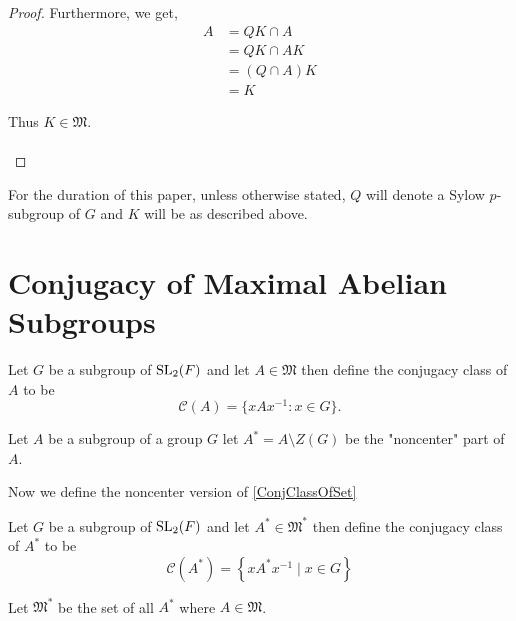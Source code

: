 \begin{footnotesize}
\begin{proof}
Furthermore, we get,
\begin{align*} A &= QK \cap A
\\ &= QK \cap AK \tag{$K \subset A$ so $A = AK$}
\\ &= (Q \cap A)K
\\ &= K \tag{$Q \cap A = I_G$}
\end{align*}

Thus $K \in \mathfrak{M}$.\\
\\
\end{proof}


For the duration of this paper, unless otherwise stated, $Q$ will denote a Sylow $p$-subgroup of $G$ and $K$ will be as described above. 


\section{Conjugacy of Maximal Abelian Subgroups}

\begin{definition}
  \label{ConjClassOfSet}
  \leanok
  Let $G$ be a subgroup of $\operatorname{SL}_2(F)$ and let $A \in \mathfrak{M}$ then define the conjugacy class of $A$ to be 
  \[
  \mathcal{C}(A) = \{ x A x^{-1} : x \in G \}.
  \]
\end{definition}


\begin{definition}
  \label{Subgroup.noncenter}
  \leanok
  Let $A$ be a subgroup of a group $G$ let $A^* = A \setminus Z(G)$ be the "noncenter" part of $A$.
\end{definition}


Now we define the noncenter version of \ref{ConjClassOfSet}

\begin{definition}
  \label{noncenter_ConjClassOfSet}
  \leanok
  Let $G$ be a subgroup of $\operatorname{SL}_2(F)$ and let $A^* \in \mathfrak{M}^*$ then define the conjugacy class of $A^*$ to be
  \[
  \mathcal{C}(A^*) = \left\{x A^* x^{-1} \; | \; x \in G \right\}
   \]
\end{definition}


\begin{definition}
\label{noncenter_MaximalAbelianSubgroupsOf}
\leanok
Let $\mathfrak{M}^*$ be the set of all $A^*$ where $A \in \mathfrak{M}$.
\end{definition}



\end{footnotesize}
